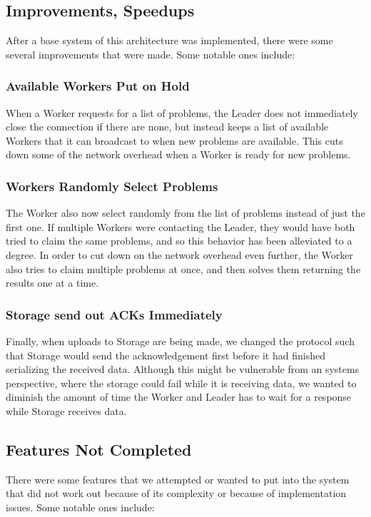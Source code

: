 \documentclass[11pt]{article}
\begin{document}
\subsection{Improvements, Speedups}
After a base system of this architecture was implemented, there were some several improvements that were made. Some notable ones include:

\subsubsection{Available Workers Put on Hold}
When a Worker requests for a list of problems, the Leader does not immediately close the connection if there are none, but instead keeps a list of available Workers that it can broadcast to when new problems are available. This cuts down some of the network overhead when a Worker is ready for new problems. 

\subsubsection{Workers Randomly Select Problems}
The Worker also now select randomly from the list of problems instead of just the first one. If multiple Workers were contacting the Leader, they would have both tried to claim the same problems, and so this behavior has been alleviated to a degree. In order to cut down on the network overhead even further, the Worker also tries to claim multiple problems at once, and then solves them returning the results one at a time.

\subsubsection{Storage send out ACKs Immediately}
Finally, when uploads to Storage are being made, we changed the protocol such that Storage would send the acknowledgement first before it had finished serializing the received data. Although this might be vulnerable from an systems perspective, where the storage could fail while it is receiving data, we wanted to diminish the amount of time the Worker and Leader has to wait for a response while Storage receives data.


\subsection{Features Not Completed}
There were some features that we attempted or wanted to put into the system that did not work out because of its complexity or because of implementation issues. Some notable ones include:
\end{document}
